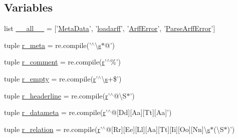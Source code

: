 \subsection*{Variables}
\begin{DoxyCompactItemize}
\item 
list \hyperlink{namespacescipy_1_1io_1_1arff_1_1arffread_a475336f0d3b36de522d22311c6eb4adf}{\+\_\+\+\_\+all\+\_\+\+\_\+} = \mbox{[}'\hyperlink{classscipy_1_1io_1_1arff_1_1arffread_1_1MetaData}{Meta\+Data}', '\hyperlink{namespacescipy_1_1io_1_1arff_1_1arffread_a60f6a18abd738377a264b050ed020902}{loadarff}', '\hyperlink{classscipy_1_1io_1_1arff_1_1arffread_1_1ArffError}{Arff\+Error}', '\hyperlink{classscipy_1_1io_1_1arff_1_1arffread_1_1ParseArffError}{Parse\+Arff\+Error}'\mbox{]}
\item 
tuple \hyperlink{namespacescipy_1_1io_1_1arff_1_1arffread_aaee5fb44344792389adb63f8fe891f45}{r\+\_\+meta} = re.\+compile('$^\wedge$\textbackslash{}\hyperlink{indexexpr_8h_ae024b0db549122b44c349ae28ec990dc}{s}$\ast$@')
\item 
tuple \hyperlink{namespacescipy_1_1io_1_1arff_1_1arffread_a06cd4c0b17ad350443c4019558a73616}{r\+\_\+comment} = re.\+compile(\hyperlink{indexexpr_8h_ac434fd11cc2493608d8d91424d60c17e}{r}'$^\wedge$\%')
\item 
tuple \hyperlink{namespacescipy_1_1io_1_1arff_1_1arffread_a7dde3e116c88d73a339c27b54cccdf23}{r\+\_\+empty} = re.\+compile(\hyperlink{indexexpr_8h_ac434fd11cc2493608d8d91424d60c17e}{r}'$^\wedge$\textbackslash{}\hyperlink{indexexpr_8h_ae024b0db549122b44c349ae28ec990dc}{s}+\$')
\item 
tuple \hyperlink{namespacescipy_1_1io_1_1arff_1_1arffread_a3bf854b4ee21d61af48f38bd13498240}{r\+\_\+headerline} = re.\+compile(\hyperlink{indexexpr_8h_ac434fd11cc2493608d8d91424d60c17e}{r}'$^\wedge$@\textbackslash{}S$\ast$')
\item 
tuple \hyperlink{namespacescipy_1_1io_1_1arff_1_1arffread_a02e49a1d2f55d371a443c2d88223bcd0}{r\+\_\+datameta} = re.\+compile(\hyperlink{indexexpr_8h_ac434fd11cc2493608d8d91424d60c17e}{r}'$^\wedge$@\mbox{[}Dd\mbox{]}\mbox{[}Aa\mbox{]}\mbox{[}Tt\mbox{]}\mbox{[}Aa\mbox{]}')
\item 
tuple \hyperlink{namespacescipy_1_1io_1_1arff_1_1arffread_aa7b8cb61c29f4f0212e873442bbc014f}{r\+\_\+relation} = re.\+compile(\hyperlink{indexexpr_8h_ac434fd11cc2493608d8d91424d60c17e}{r}'$^\wedge$@\mbox{[}Rr\mbox{]}\mbox{[}Ee\mbox{]}\mbox{[}Ll\mbox{]}\mbox{[}Aa\mbox{]}\mbox{[}Tt\mbox{]}\mbox{[}Ii\mbox{]}\mbox{[}Oo\mbox{]}\mbox{[}Nn\mbox{]}\textbackslash{}\hyperlink{indexexpr_8h_ae024b0db549122b44c349ae28ec990dc}{s}$\ast$(\textbackslash{}S$\ast$)')

\end{DoxyCompactItemize}
